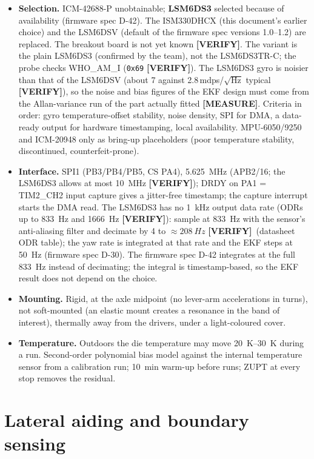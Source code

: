 \documentclass[11pt,a4paper]{article}
\newcommand{\mk}[2]{\textsf{\scriptsize\bfseries\colorbox{#1bg}{\color{#1}[#2]}}}
\newcommand{\MEASURE}{\mk{warn}{MEASURE}}
\newcommand{\VERIFY}{\mk{cold}{VERIFY}}
\begin{document}
\begin{itemize}[leftmargin=6mm]
\item \textbf{Selection.} ICM-42688-P unobtainable; \textbf{LSM6DS3}
selected because of availability (firmware spec D-42). The ISM330DHCX
(this document's earlier choice) and the LSM6DSV (default of the firmware spec
versions 1.0--1.2) are replaced. The breakout board is
not yet known \VERIFY. The variant is the plain LSM6DS3 (confirmed by the team), not the
LSM6DS3TR-C; the probe checks WHO\_AM\_I (\texttt{0x69} \VERIFY). The LSM6DS3 gyro is
noisier than that of the LSM6DSV (about 7 against 2.8\,mdps/$\sqrt{\mathrm{Hz}}$
typical \VERIFY), so the noise and bias figures of the EKF design must come from
the Allan-variance run of the part actually fitted \MEASURE. Criteria in
order: gyro temperature-offset stability, noise density, SPI for DMA, a data-ready
output for hardware timestamping, local availability. MPU-6050/9250 and
ICM-20948 only as bring-up placeholders (poor temperature stability,
discontinued, counterfeit-prone).
\item \textbf{Interface.} SPI1 (PB3/PB4/PB5, CS PA4), \qty{5.625}{MHz} (APB2/16; the LSM6DS3 allows at most \qty{10}{MHz} \VERIFY); DRDY
on PA1 = TIM2\_CH2 input capture gives a jitter-free timestamp; the capture
interrupt starts the DMA read. The LSM6DS3 has no \qty{1}{kHz} output data rate (ODRs up to \qty{833}{Hz} and \qty{1666}{Hz} \VERIFY): sample at \qty{833}{Hz} with the sensor's
anti-aliasing filter and decimate by 4 to $\approx\qty{208}{Hz}$ \VERIFY\ (datasheet ODR table); the yaw rate is integrated at that rate and the EKF steps at \qty{50}{Hz} (firmware spec D-30). The firmware spec D-42 integrates at the full \qty{833}{Hz} instead of decimating; the integral is timestamp-based, so the EKF result does not depend on the choice.
\item \textbf{Mounting.} Rigid, at the axle midpoint (no lever-arm accelerations
in turns), not soft-mounted (an elastic mount creates a resonance in the band of
interest), thermally away from the drivers, under a light-coloured cover.
\item \textbf{Temperature.} Outdoors the die temperature may move
\qtyrange{20}{30}{K} during a run. Second-order polynomial bias model against the
internal temperature sensor from a calibration run; \qty{10}{min} warm-up before
runs; ZUPT at every stop removes the residual.
\end{itemize}
\clearpage
\section{Lateral aiding and boundary sensing}\label{sec:lateral}
\end{document}
